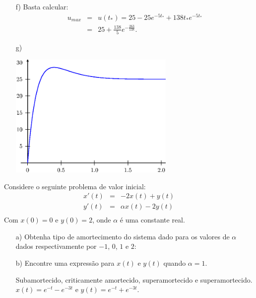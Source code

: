 \begin{resol}
\begin{itemize}
\item[f)] Basta calcular:
\begin{eqnarray*}
 u_{max}&=&u(t_\ast)= 25-25e^{-5t_\ast}+ 138 t_\ast e^{-5t_\ast}\\
&=&25+ \frac{138}{5} e^{-\frac{263}{138}}.
\end{eqnarray*}
\item[g)] 

\begin{center}\includegraphics[width=8cm]{cap_sistemas/pics/figura_7}\end{center}
\end{itemize}

\end{resol}

\begin{exer}
Considere o seguinte problema de valor inicial:
\begin{eqnarray*}
x'(t)&=&-2x(t) +  y(t)\\
y'(t)&=&\alpha x(t) - 2y(t)\\
\end{eqnarray*}
Com $x(0)=0$ e $y(0)=2$, onde $\alpha$ é uma constante real.
\begin{itemize}
 \item[a)] Obtenha tipo de amortecimento do sistema dado para os valores de $\alpha$ dados respectivamente por $-1$, $0$, $1$ e $2$:
 \item [b)] Encontre uma expressão para $x(t)$ e $y(t)$ quando $\alpha=1$. 
 
 Subamortecido, criticamente amortecido, superamortecido e superamortecido. $x(t)=e^{-t}-e^{-3t}$ e $y(t)=e^{-t}+e^{-3t}$.
\end{itemize}

\end{exer}

